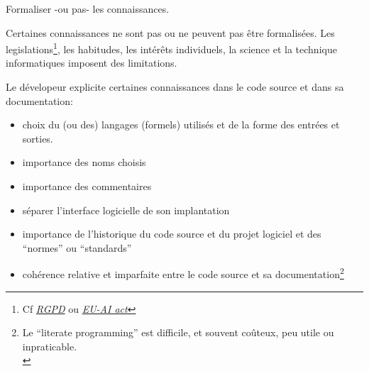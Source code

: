 \documentclass[final,a4,xcolor={svgnames,dvipsnames}]{beamer}
\begin{document}
 \begin{frame}{Formaliser -ou pas- les connaissances.}

   Certaines connaissances ne sont pas ou ne peuvent pas être
   formalisées. Les legislations\footnote{Cf
   \href{https://www.cnil.fr/fr/reglement-europeen-protection-donnees}{\it RGPD}
   ou
   \href{https://artificialintelligenceact.eu/high-level-summary/}{\it EU-AI
     act}}, les habitudes, les intérêts individuels, la science et la
   technique informatiques imposent des limitations.

   \bigskip
   
   Le dévelopeur explicite certaines connaissances dans le code source et
   dans sa documentation:
   \begin{relsize}{-0.5}
   \begin{itemize}
   \item choix du (ou des) langages (formels) utilisés et de la forme des entrées et sorties.
   \item importance des noms choisis
   \item importance des commentaires
   \item séparer l'interface logicielle de son implantation
   \item importance de l'historique du code source et du projet
     logiciel et des ``normes'' ou ``standards''
   \item cohérence relative et imparfaite entre le code source et sa
     documentation\footnote{Le ``literate programming'' est difficile,
     et souvent coûteux, peu utile ou inpraticable.\medskip\\}
   \end{itemize}
   \end{relsize}
 \end{frame}
\end{document}
